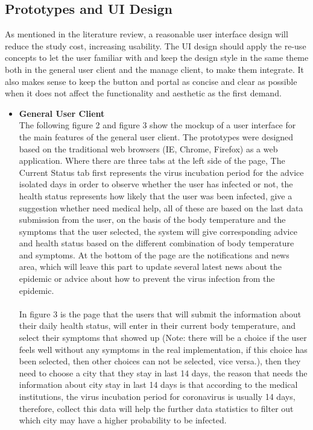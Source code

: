 \documentclass[12pt]{article}
\begin{document}
\subsection{Prototypes and UI Design}
As mentioned in the literature review, a reasonable user interface design will reduce the study cost, increasing usability. The UI design should apply the re-use concepts to let the user familiar with and keep the design style in the same theme both in the general user client and the manage client, to make them integrate. It also makes sense to keep the button and portal as concise and clear as possible when it does not affect the functionality and aesthetic as the first demand. 
\begin{itemize}
\item\textbf{General User Client}
\\The following figure 2 and figure 3 show the mockup of a user interface for the main features of the general user client. The prototypes were designed based on the traditional web browsers (IE, Chrome, Firefox) as a web application. Where there are three tabs at the left side of the page, The Current Status tab first represents the virus incubation period for the advice isolated days in order to observe whether the user has infected or not, the health status represents how likely that the user was been infected, give a suggestion whether need medical help, all of these are based on the last data submission from the user, on the basis of the body temperature and the symptoms that the user selected, the system will give corresponding advice and health status based on the different combination of body temperature and symptoms. At the bottom of the page are the notifications and news area, which will leave this part to update several latest news about the epidemic or advice about how to prevent the virus infection from the epidemic.
\\
\\In figure 3 is the page that the users that will submit the information about their daily health status, will enter in their current body temperature, and select their symptoms that showed up (Note: there will be a choice if the user feels well without any symptoms in the real implementation, if this choice has been selected, then other choices can not be selected, vice versa.), then they need to choose a city that they stay in last 14 days, the reason that needs the information about city stay in last 14 days is that according to the medical institutions, the virus incubation period for coronavirus is usually 14 days, therefore, collect this data will help the further data statistics to filter out which city may have a higher probability to be infected.

\end{itemize}
\end{document}
